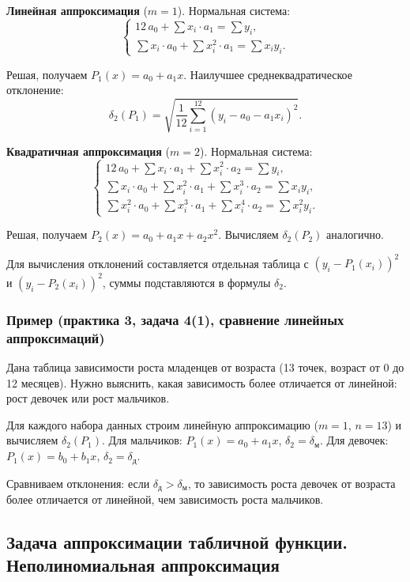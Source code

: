 \textbf{Линейная аппроксимация} ($m = 1$). Нормальная система:
\[
    \begin{cases}
        12\, a_0 + \sum x_i \cdot a_1 = \sum y_i, \\
        \sum x_i \cdot a_0 + \sum x_i^2 \cdot a_1 = \sum x_i y_i.
    \end{cases}
\]

Решая, получаем $P_1(x) = a_0 + a_1 x$. Наилучшее среднеквадратическое отклонение:
\[
    \delta_2(P_1) = \sqrt{\frac{1}{12} \sum_{i=1}^{12} (y_i - a_0 - a_1 x_i)^2}.
\]

\textbf{Квадратичная аппроксимация} ($m = 2$). Нормальная система:
\[
    \begin{cases}
        12\, a_0 + \sum x_i \cdot a_1 + \sum x_i^2 \cdot a_2 = \sum y_i, \\
        \sum x_i \cdot a_0 + \sum x_i^2 \cdot a_1 + \sum x_i^3 \cdot a_2 = \sum x_i y_i, \\
        \sum x_i^2 \cdot a_0 + \sum x_i^3 \cdot a_1 + \sum x_i^4 \cdot a_2 = \sum x_i^2 y_i.
    \end{cases}
\]

Решая, получаем $P_2(x) = a_0 + a_1 x + a_2 x^2$. Вычисляем $\delta_2(P_2)$ аналогично.

Для вычисления отклонений составляется отдельная таблица с $(y_i - P_1(x_i))^2$ и $(y_i - P_2(x_i))^2$, суммы подставляются в формулы $\delta_2$.


\subsubsection*{Пример (практика 3, задача 4(1), сравнение линейных аппроксимаций)}

Дана таблица зависимости роста младенцев от возраста (13 точек, возраст от 0 до 12 месяцев). Нужно выяснить, какая зависимость более отличается от линейной: рост девочек или рост мальчиков.

Для каждого набора данных строим линейную аппроксимацию ($m = 1$, $n = 13$) и вычисляем $\delta_2(P_1)$. Для мальчиков: $P_1(x) = a_0 + a_1 x$, $\delta_2 = \delta_{\text{м}}$. Для девочек: $P_1(x) = b_0 + b_1 x$, $\delta_2 = \delta_{\text{д}}$.

Сравниваем отклонения: если $\delta_{\text{д}} > \delta_{\text{м}}$, то зависимость роста девочек от возраста более отличается от линейной, чем зависимость роста мальчиков.


\newpage
\subsection{Задача аппроксимации табличной функции. Неполиномиальная аппроксимация}

